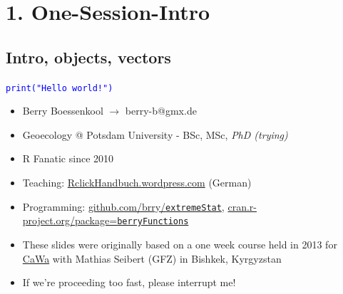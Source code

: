 \documentclass[xcolor=table,       handout,    xcolor=dvipsnames]{beamer}\usepackage[]{graphicx}\usepackage[]{color}
\newcommand{\rcode}[1]{\texttt{\textcolor{Blue}{#1}}} %
\begin{document}
\section{1. One-Session-Intro}

\subsection{Intro, objects, vectors}

\begin{frame}{\rcode{print("Hello world!")}}
\begin{itemize}[<+->]
\item Berry Boessenkool $\rightarrow$ berry-b@gmx.de
\item Geoecology @ Potsdam University \onslide<+-> - BSc\onslide<+->, MSc\onslide<+->, \textit{PhD (trying)}
\item R Fan\onslide<+->atic \onslide<+-> since 2010
\item Teaching: \href{https://rclickhandbuch.wordpress.com}{RclickHandbuch.wordpress.com} (German)
\item Programming: \href{https://github.com/brry}{github.com/brry/\texttt{extremeStat}}, \onslide<+->\href{https://cran.r-project.org/package=berryFunctions}{cran.r-project.org/package=\texttt{berryFunctions}}
\item These slides were originally based on a one week course held in 2013 for \href{http://www.cawa-project.net/story/300}{CaWa} with Mathias Seibert (GFZ) in Bishkek, Kyrgyzstan
\item \alert{If we're proceeding too fast, please interrupt me!}
\end{itemize}
\end{frame}

\end{document}
